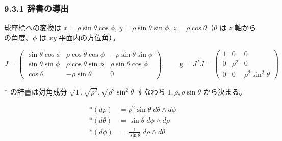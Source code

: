 \documentclass[a4paper,12pt,openany]{book}
\begin{document}
\hypertarget{ux8f9eux66f8ux306eux5c0eux51fa-1}{%
\subsubsection{9.3.1
辞書の導出}\label{ux8f9eux66f8ux306eux5c0eux51fa-1}}

球座標への変換は \(x = \rho\sin\theta\cos\phi\),
\(y = \rho\sin\theta\sin\phi\), \(z = \rho\cos\theta\)（\(\theta\) は
\(z\) 軸からの角度、\(\phi\) は \(xy\) 平面内の方位角）。

\[J = \begin{pmatrix}
\sin\theta\cos\phi & \rho\cos\theta\cos\phi & -\rho\sin\theta\sin\phi \\
\sin\theta\sin\phi & \rho\cos\theta\sin\phi & \rho\sin\theta\cos\phi \\
\cos\theta & -\rho\sin\theta & 0
\end{pmatrix},\qquad
\mathbf{g} = J^T J = \begin{pmatrix}
1 & 0 & 0 \\
0 & \rho^2 & 0 \\
0 & 0 & \rho^2\sin^2\theta
\end{pmatrix}\]

\(\ast\) の辞書は対角成分
\(\sqrt{1}, \sqrt{\rho^2}, \sqrt{\rho^2\sin^2\theta}\) すなわち
\(1, \rho, \rho\sin\theta\) から決まる。

\[\begin{aligned}
\ast(d\rho) &= \rho^2\sin\theta\; d\theta \wedge d\phi \\
\ast(d\theta) &= \sin\theta\; d\phi \wedge d\rho \\
\ast(d\phi) &= \frac{1}{\sin\theta}\; d\rho \wedge d\theta
\end{aligned}\]
\end{document}
